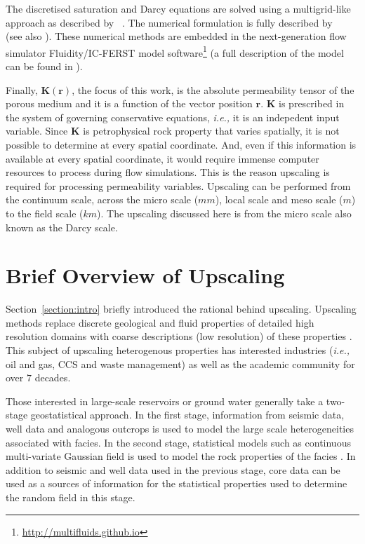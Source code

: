 \documentclass[preprint,12pt]{elsarticle}
\newcommand{\ie}{{\it i.e., }}
\begin{document}
\medskip
The discretised saturation and Darcy equations are solved using a multigrid-like approach as described by \citeauthor{pavlidis2016}~\cite{pavlidis2016}. The numerical formulation is fully described by \citeauthor{Gomes_2017}~\cite{Gomes_2017} (see also \cite{salinas2015,adam_2016}). These numerical methods are embedded in the next-generation flow simulator Fluidity/IC-FERST model software\footnote{\href{http://multifluids.github.io}{http://multifluids.github.io}} (a full description of the model can be found in \cite{jackson_2013,Gomes_2017}).


\medskip
Finally, $\mathbf{K}\left(\mathbf{r}\right)$, the focus of this work, is the absolute permeability tensor of the porous medium and it is a function of the vector position $\mathbf{r}$. $\mathbf{K}$ is prescribed in the system of governing conservative equations, \ie it is an indepedent input variable. Since $\mathbf{K}$ is petrophysical rock property that varies spatially, it is not possible to determine at every spatial coordinate. And, even if this information is available at every spatial coordinate, it would require immense computer resources to process during flow simulations. This is the reason upscaling is required for processing permeability variables. Upscaling can be performed from the continuum scale, across the micro scale ($mm$), local scale and meso scale ($m$) to the field scale ($km$)\cite{ECMI_2004}. The upscaling discussed here is from the micro scale also known as the Darcy scale.

\section{Brief Overview of Upscaling}\label{section:overview_upscaling}

Section~\ref{section:intro} briefly introduced the rational behind upscaling. Upscaling methods replace discrete geological and fluid properties of detailed high resolution domains with coarse descriptions (low resolution) of these properties \cite{Vereecken_2007}. This subject of upscaling heterogenous properties has interested industries (\ie oil and gas, CCS and waste management) as well as the academic community for over $7$ decades.

Those interested in large-scale reservoirs or ground water generally take a two-stage geostatistical approach. In the first stage, information from seismic data, well data and analogous outcrops is used to model the large scale heterogeneities associated with facies. In the second stage, statistical models such as continuous multi-variate Gaussian field is used to model the rock properties of the facies \cite{Ewing_1997}. In addition to seismic and well data used in the previous stage, core data can be used as a sources of information for the statistical properties used to determine the random field in this stage.
\end{document}
